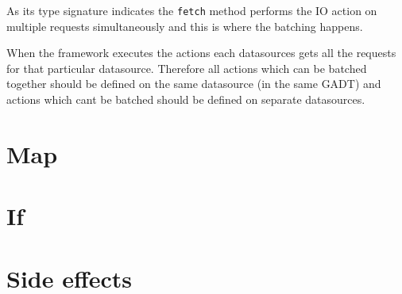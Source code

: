 As its type signature indicates the \texttt{fetch} method performs the IO action on multiple requests simultaneously and this is where the batching happens.

When the framework executes the actions each datasources gets all the requests for that particular datasource. Therefore all actions which can be batched together should be defined on the same datasource (in the same GADT) and actions which cant be batched should be defined on separate datasources.


\section{Map}


\section{If}


\section{Side effects}

